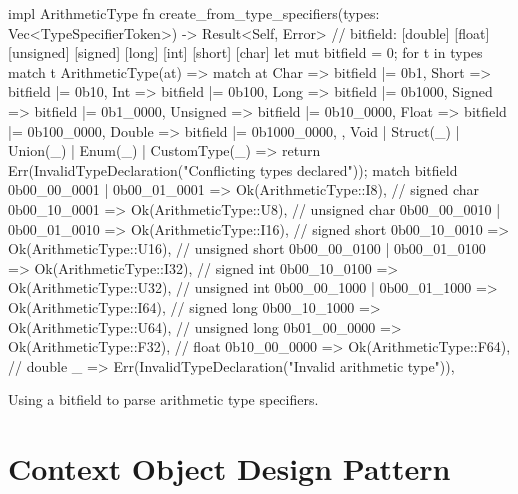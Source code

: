 \documentclass[../00-main.tex]{subfiles}
\begin{document}
\begin{listing}[!t]
  \begin{RustListing}
    impl ArithmeticType {
        fn create_from_type_specifiers(types: Vec<TypeSpecifierToken>) -> Result<Self, Error> {
            // bitfield: [double] [float] [unsigned] [signed] [long] [int] [short] [char]
            let mut bitfield = 0;
            for t in types {
                match t {
                    ArithmeticType(at) => match at {
                        Char => bitfield |= 0b1,
                        Short => bitfield |= 0b10,
                        Int => bitfield |= 0b100,
                        Long => bitfield |= 0b1000,
                        Signed => bitfield |= 0b1_0000,
                        Unsigned => bitfield |= 0b10_0000,
                        Float => bitfield |= 0b100_0000,
                        Double => bitfield |= 0b1000_0000,
                    },
                    Void | Struct(_) | Union(_) | Enum(_) | CustomType(_) => {
                        return Err(InvalidTypeDeclaration("Conflicting types declared"));
                    }
                }
            }
            match bitfield {
                0b00_00_0001 | 0b00_01_0001 => Ok(ArithmeticType::I8),  // signed char
                0b00_10_0001 => Ok(ArithmeticType::U8),                 // unsigned char
                0b00_00_0010 | 0b00_01_0010 => Ok(ArithmeticType::I16), // signed short
                0b00_10_0010 => Ok(ArithmeticType::U16),                // unsigned short
                0b00_00_0100 | 0b00_01_0100 => Ok(ArithmeticType::I32), // signed int
                0b00_10_0100 => Ok(ArithmeticType::U32),                // unsigned int
                0b00_00_1000 | 0b00_01_1000 => Ok(ArithmeticType::I64), // signed long
                0b00_10_1000 => Ok(ArithmeticType::U64),                // unsigned long
                0b01_00_0000 => Ok(ArithmeticType::F32),                // float
                0b10_00_0000 => Ok(ArithmeticType::F64),                // double
                _ => Err(InvalidTypeDeclaration("Invalid arithmetic type")),
            }
        }
    }
  \end{RustListing}
  \caption{Using a bitfield to parse arithmetic type specifiers.}
  \label{app:lst:arithmetic type bitfield}
\end{listing}



\section{Context Object Design Pattern}\label{app:sec:context object design pattern}
\end{document}
